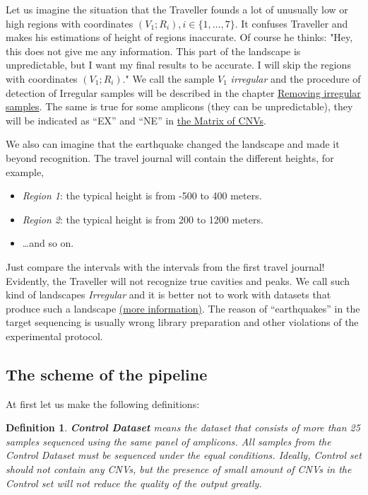 \documentclass{article}
\newtheorem{mydef}{Definition}
\begin{document}
Let us imagine the situation that the Traveller founds a lot of unusually low or high regions with coordinates $(V_1; R_i), i \in \{1,\ldots,7\}$. It confuses Traveller and makes his estimations of height of regions inaccurate. Of course he thinks: "Hey, this does not give me any information. This part of the landscape is unpredictable, but I want my final results to be accurate. I will skip the regions with coordinates $(V_1; R_i)$." We call the sample $V_1$ {\it irregular} and the procedure of detection of Irregular samples will be described in the chapter \hyperlink{removeIrrSamples}{Removing irregular samples}. The same is true for some amplicons (they can be unpredictable), they will be indicated as ``EX'' and ``NE'' in \hyperlink{fileWithCNVs}{the Matrix of CNVs}. 

We also can imagine that the earthquake changed the landscape and made it beyond recognition. The travel journal will contain the different heights, for example,   

\begin{itemize}
\item {\it Region 1}: the typical height is from -500 to 400 meters.

\item {\it Region 2}: the typical height is from 200 to 1200 meters.

\item \ldots and so on.
\end{itemize}

Just compare the intervals with the intervals from the first travel journal! Evidently, the Traveller will not recognize true cavities and peaks. We call such kind of landscapes {\it Irregular} and it is better not to work with datasets that produce such a landscape \hyperlink{averageRobustVariance}{(more information)}. The reason of ``earthquakes'' in the target sequencing is usually wrong library preparation and other violations of the experimental protocol.


\subsection{The scheme of the pipeline}

At first let us make the following definitions:
\begin{mydef}
 {\bf Control Dataset} means the dataset that consists of more than 25 samples sequenced using the same panel of amplicons. All samples from the Control Dataset must be sequenced under the equal conditions. Ideally, Control set should not contain any CNVs, but the presence of small amount of CNVs in the Control set will not reduce the quality of the output greatly.
\end{mydef}
\end{document}
